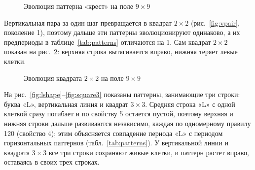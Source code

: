 \documentclass[a4paper,14pt]{extarticle}
\newcommand{\consolesmall}{\fontsize{7}{7.35}\selectfont\ttfamily}
\newcommand{\console}[2][\consolesmall]{}
\begin{document}
\begin{figure}[H]
	\centering
	\begin{minipage}{0.23\textwidth}\centering\console{cross_0}\end{minipage}
	\begin{minipage}{0.23\textwidth}\centering\console{cross_1}\end{minipage}
	\begin{minipage}{0.23\textwidth}\centering\console{cross_2}\end{minipage}
	\begin{minipage}{0.23\textwidth}\centering\console{cross_3}\end{minipage}
	\caption{Эволюция паттерна «крест» на поле $9 \times 9$}
	\label{fig:cross}
\end{figure}

Вертикальная пара за один шаг превращается в квадрат $2 \times 2$ (рис.~\ref{fig:vpair}, поколение 1), поэтому дальше эти паттерны эволюционируют одинаково, а их предпериоды в таблице~\ref{tab:patterns} отличаются на 1. Сам квадрат $2 \times 2$ показан на рис.~\ref{fig:square}: верхняя строка вытягивается вправо, нижняя теряет левые клетки.

\begin{figure}[H]
	\centering
	\begin{minipage}{0.23\textwidth}\centering\console{square_0}\end{minipage}
	\begin{minipage}{0.23\textwidth}\centering\console{square_1}\end{minipage}
	\begin{minipage}{0.23\textwidth}\centering\console{square_2}\end{minipage}
	\begin{minipage}{0.23\textwidth}\centering\console{square_3}\end{minipage}
	\caption{Эволюция квадрата $2 \times 2$ на поле $9 \times 9$}
	\label{fig:square}
\end{figure}

На рис.~\ref{fig:lshape}--\ref{fig:square3} показаны паттерны, занимающие три строки: буква «L», вертикальная линия и квадрат $3 \times 3$. Средняя строка «L» с одной клеткой сразу погибает и по свойству 5 остается пустой, поэтому верхняя и нижняя строки дальше развиваются независимо, каждая по одномерному правилу 120 (свойство 4); этим объясняется совпадение периода «L» с периодом горизонтальных паттернов (табл.~\ref{tab:patterns}). У вертикальной линии и квадрата $3 \times 3$ все три строки сохраняют живые клетки, и паттерн растет вправо, оставаясь в своих трех строках.
\end{document}

